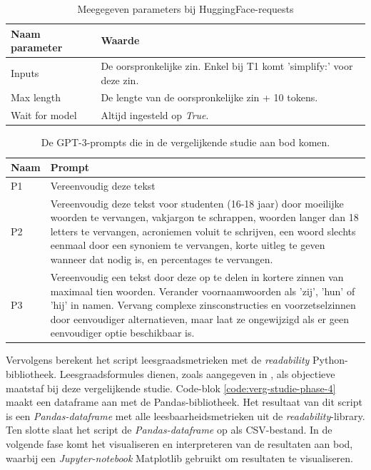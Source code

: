 \begin{center}
	\begin{table}[H]
		\begin{tabular}{ | m{6cm} | m{8cm} | } 
			\hline
			\textbf{Naam parameter} & \textbf{Waarde} \\
			\hline
			Inputs & De oorspronkelijke zin. Enkel bij T1 komt 'simplify:' voor deze zin. \\
			\hline
			Max length & De lengte van de oorspronkelijke zin + 10 tokens. \\
			\hline
			Wait for model & Altijd ingesteld op \textit{True}. \\
			\hline
		\end{tabular}
		\caption{Meegegeven parameters bij HuggingFace-requests}
		\label{table:huggingface-requests-parameters}
	\end{table}
\end{center}

\begin{center}
	\begin{table}[H]
		\begin{tabular}{ | m{2cm} | m{13cm} | } 
			\hline
			\textbf{Naam} & \textbf{Prompt} \\
			\hline
			P1 & Vereenvoudig deze tekst \\
			\hline
			P2 & Vereenvoudig deze tekst voor studenten (16-18 jaar) door moeilijke woorden te vervangen, vakjargon te schrappen, woorden langer dan 18 letters te vervangen, acroniemen voluit te schrijven, een woord slechts eenmaal door een synoniem te vervangen, korte uitleg te geven wanneer dat nodig is, en percentages te vervangen. \\
			\hline
			P3 & Vereenvoudig een tekst door deze op te delen in kortere zinnen van maximaal tien woorden. Verander voornaamwoorden als 'zij', 'hun' of 'hij' in namen. Vervang complexe zinsconstructies en voorzetselzinnen door eenvoudiger alternatieven, maar laat ze ongewijzigd als er geen eenvoudiger optie beschikbaar is. \\
			\hline
		\end{tabular}
		\caption{De GPT-3-prompts die in de vergelijkende studie aan bod komen.}
		\label{table:tested-prompts}
	\end{table}
\end{center}


% 
Vervolgens berekent het script leesgraadsmetrieken met de \textit{readability} Python-bibliotheek. Leesgraadsformules dienen, zoals aangegeven in \textcite{Nenkova2004}, als objectieve maatstaf bij deze vergelijkende studie. Code-blok \ref{code:verg-studie-phase-4} maakt een dataframe aan met de Pandas-bibliotheek. Het resultaat van dit script is een \textit{Pandas-dataframe} met alle leesbaarheidsmetrieken uit de \textit{readability}-library. Ten slotte slaat het script de \textit{Pandas-dataframe} op als CSV-bestand. In de volgende fase komt het visualiseren en interpreteren van de resultaten aan bod, waarbij een \textit{Jupyter-notebook} Matplotlib gebruikt om resultaten te visualiseren.

